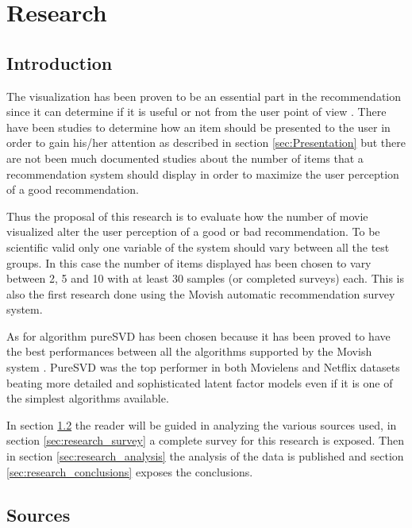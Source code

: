 \chapter{Research}
\label{chapter:<research_number_of_items>}

\section{Introduction}
\label{sec:research_introduction}

The visualization has been proven to be an essential part in the recommendation since it can determine if it is useful or not from the user point of view \cite{trust-building}. There have been studies to determine how an item should be presented to the user in order to gain his/her attention as described in section \ref{sec:Presentation} but there are not been much documented studies about the number of items that a recommendation system should display in order to maximize the user perception of a good recommendation.

Thus the proposal of this research is to evaluate how the number of movie visualized alter the user perception of a good or bad recommendation. To be scientific valid only one variable of the system should vary between all the test groups. In this case the number of items displayed has been chosen to vary between 2, 5 and 10 with at least 30 samples (or completed surveys) each. This is also the first research done using the Movish automatic recommendation survey system.  

As for algorithm pureSVD has been chosen because it has been proved to have the best performances between all the algorithms supported by the Movish system \cite{performance-recommender-algorithms}. PureSVD was the top performer in both Movielens and Netflix \cite{netflixprize} datasets beating more detailed and sophisticated latent factor models even if it is one of the simplest algorithms available.

In section \ref{sec:research_sources} the reader will be guided in analyzing the various sources used, in section \ref{sec:research_survey} a complete survey for this research is exposed. Then in section \ref{sec:research_analysis} the analysis of the data is published and section \ref{sec:research_conclusions} exposes the conclusions.

\section{Sources}
\label{sec:research_sources}

